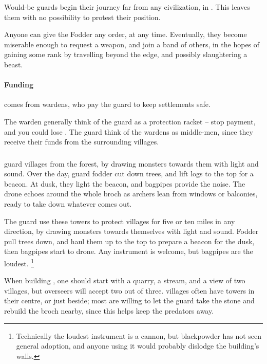 \begin{multicols}{2}
\noindent
Would-be \glspl{guard} begin their journey far from any civilization, in .
This leaves them with no possibility to protest their position.

Anyone can give the Fodder any order, at any time.
Eventually, they become miserable enough to request a weapon, and join a band of others, in the hopes of gaining some rank by travelling beyond the \gls{edge}, and possibly slaughtering a beast.


\paragraph{Funding}
comes from \glspl{warden}, who pay the guard to keep settlements safe.

The \gls{warden} generally think of the \gls{guard} as a protection racket -- stop payment, and you could lose .
The \gls{guard} think of the \glspl{warden} as middle-men, since they receive their funds from the surrounding \glspl{village}.

\subsubsection{}
guard \glspl{village} from the forest, by drawing monsters towards them with light and sound.
Over the day, \gls{guard} fodder cut down trees, and lift logs to the top for a beacon.
At dusk, they light the beacon, and bagpipes provide the noise.
The drone echoes around the whole \gls{broch} as archers lean from windows or balconies, ready to take down whatever comes out.

The \gls{guard} use these towers to protect \glspl{village} for five or ten miles in any direction, by drawing monsters towards themselves with light and sound.
Fodder pull trees down, and haul them up to the top to prepare a beacon for the dusk, then bagpipes start to drone.
Any instrument is welcome, but bagpipes are the loudest.%
\footnote{Technically the loudest instrument is a cannon, but blackpowder has not seen general adoption, and anyone using it would probably dislodge the building's walls.}

When building , one should start with a quarry, a stream, and a view of two \glspl{village}, but overseers will accept two out of three.
\Glspl{village} often have towers in their centre, or just beside; most are willing to let the \gls{guard} take the stone and rebuild the \gls{broch} nearby, since this helps keep the predators away.


\end{multicols}
